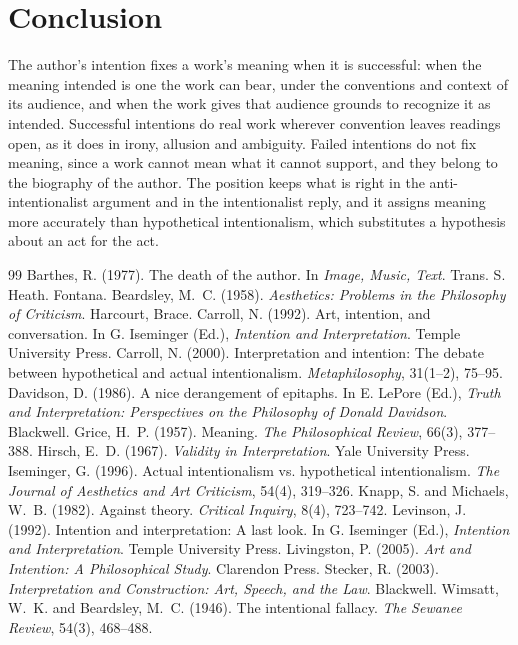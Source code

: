 \documentclass{situationist-preprint}
\begin{document}
\section{Conclusion}

The author's intention fixes a work's meaning when it is successful: when the meaning intended is one the work can bear, under the conventions and context of its audience, and when the work gives that audience grounds to recognize it as intended. Successful intentions do real work wherever convention leaves readings open, as it does in irony, allusion and ambiguity. Failed intentions do not fix meaning, since a work cannot mean what it cannot support, and they belong to the biography of the author. The position keeps what is right in the anti-intentionalist argument and in the intentionalist reply, and it assigns meaning more accurately than hypothetical intentionalism, which substitutes a hypothesis about an act for the act.

\begin{thebibliography}{99}\small
{} Barthes, R. (1977). The death of the author. In \emph{Image, Music, Text}. Trans. S. Heath. Fontana.
 Beardsley, M.~C. (1958). \emph{Aesthetics: Problems in the Philosophy of Criticism}. Harcourt, Brace.
 Carroll, N. (1992). Art, intention, and conversation. In G. Iseminger (Ed.), \emph{Intention and Interpretation}. Temple University Press.
 Carroll, N. (2000). Interpretation and intention: The debate between hypothetical and actual intentionalism. \emph{Metaphilosophy}, 31(1--2), 75--95.
 Davidson, D. (1986). A nice derangement of epitaphs. In E. LePore (Ed.), \emph{Truth and Interpretation: Perspectives on the Philosophy of Donald Davidson}. Blackwell.
 Grice, H.~P. (1957). Meaning. \emph{The Philosophical Review}, 66(3), 377--388.
 Hirsch, E.~D. (1967). \emph{Validity in Interpretation}. Yale University Press.
 Iseminger, G. (1996). Actual intentionalism vs. hypothetical intentionalism. \emph{The Journal of Aesthetics and Art Criticism}, 54(4), 319--326.
 Knapp, S. and Michaels, W.~B. (1982). Against theory. \emph{Critical Inquiry}, 8(4), 723--742.
 Levinson, J. (1992). Intention and interpretation: A last look. In G. Iseminger (Ed.), \emph{Intention and Interpretation}. Temple University Press.
 Livingston, P. (2005). \emph{Art and Intention: A Philosophical Study}. Clarendon Press.
 Stecker, R. (2003). \emph{Interpretation and Construction: Art, Speech, and the Law}. Blackwell.
 Wimsatt, W.~K. and Beardsley, M.~C. (1946). The intentional fallacy. \emph{The Sewanee Review}, 54(3), 468--488.
\end{thebibliography}
\end{document}
